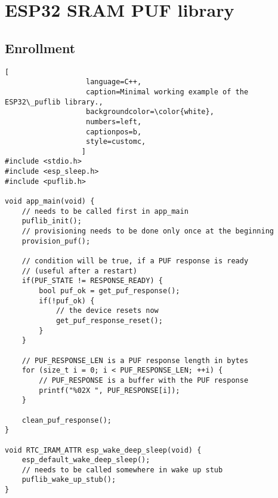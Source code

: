 \chapter{ESP32 SRAM PUF library}\label{sec:puflib}

\section{Enrollment}

\newpage

\begin{lstlisting}[
                   language=C++,
                   caption=Minimal working example of the ESP32\_puflib library.,
                   backgroundcolor=\color{white},
                   numbers=left,
                   captionpos=b,
                   style=customc,
                  ]
#include <stdio.h>
#include <esp_sleep.h>
#include <puflib.h>

void app_main(void) { 
    // needs to be called first in app_main
    puflib_init();
    // provisioning needs to be done only once at the beginning
    provision_puf();

    // condition will be true, if a PUF response is ready
    // (useful after a restart)
    if(PUF_STATE != RESPONSE_READY) {
        bool puf_ok = get_puf_response();
        if(!puf_ok) {
            // the device resets now
            get_puf_response_reset();
        }
    }

    // PUF_RESPONSE_LEN is a PUF response length in bytes
    for (size_t i = 0; i < PUF_RESPONSE_LEN; ++i) {
        // PUF_RESPONSE is a buffer with the PUF response
        printf("%02X ", PUF_RESPONSE[i]);
    }

    clean_puf_response();
}

void RTC_IRAM_ATTR esp_wake_deep_sleep(void) {
    esp_default_wake_deep_sleep();
    // needs to be called somewhere in wake up stub
    puflib_wake_up_stub();
}
\end{lstlisting}

